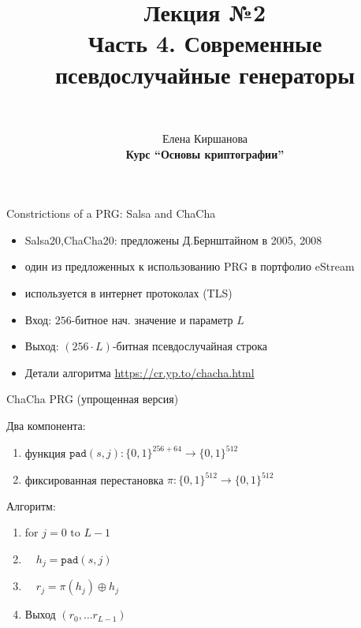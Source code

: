 \documentclass[usenames,dvipsnames,8pt,aspectratio=169]{beamer}
\author{\\ [10pt]
}
\title{Лекция №2 \\[10pt]
		Часть 4. Современные псевдослучайные генераторы}
\date{ Елена Киршанова \\  \textbf{Курс ``Основы криптографии''} \\  }
\begin{document}
	
\begin{frame}
	\titlepage
\end{frame}



\begin{frame}{Constrictions of a PRG: Salsa and ChaCha}
\Large
	\begin{itemize}
		\itemsep 10pt
		\item Salsa20,ChaCha20: предложены Д.Бернштайном в 2005, 2008
		\item один из предложенных к использованию PRG в портфолио eStream
		\item используется в интернет протоколах (TLS)
		\item Вход: $256$-битное нач. значение и параметр $L$
		\item Выход: $(256 \cdot L)$-битная псевдослучайная строка
		\item Детали алгоритма \url{https://cr.yp.to/chacha.html} 
	\end{itemize}

	
\end{frame}

\begin{frame}{ChaCha PRG (упрощенная версия)}
\LARGE

Два компонента:
\begin{enumerate}
	\itemsep 8pt
	\item функция $\texttt{pad}(s, j) : \{0,1\}^{256 + 64} \rightarrow \{0,1\}^{512}$
	\item фиксированная перестановка $\pi  : \{0,1\}^{512} \rightarrow \{0,1\}^{512} $
\end{enumerate}

\vspace{30pt}

Алгоритм:
\begin{enumerate}
	\item for  $j  =  0 \text{ to } L-1 $ 
	 \item $\quad h_j = \texttt{pad}(s, j) $
	 \item $\quad r_j = \pi(h_j) \oplus h_j$
	\item Выход $(r_0, \ldots r_{L-1})$
\end{enumerate}
\end{frame}
\end{document}

